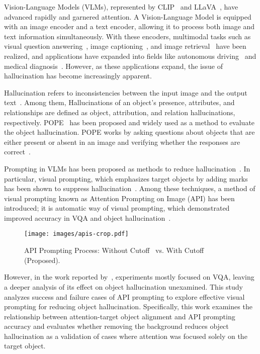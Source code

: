 Vision-Language Models (VLMs), represented by CLIP~\cite{clip} and LLaVA~\cite{llava}, have advanced rapidly and garnered attention. A Vision-Language Model is equipped with an image encoder and a text encoder, allowing it to process both image and text information simultaneously. With these encoders, multimodal tasks such as visual question answering~\cite{vqa}, image captioning~\cite{caption}, and image retrieval~\cite{retrieval} have been realized, and applications have expanded into fields like autonomous driving~\cite{autonomous} and medical diagnosis~\cite{medical}. However, as these applications expand, the issue of hallucination has become increasingly apparent.

Hallucination refers to inconsistencies between the input image and the output text~\cite{hallucination}. Among them, Hallucinations of an object's presence, attributes, and relationships are defined as object, attribution, and relation hallucinations, respectively. POPE~\cite{pope} has been proposed and widely used as a method to evaluate the object hallucination. POPE works by asking questions about objects that are either present or absent in an image and verifying whether the responses are correct~\cite{pope}.

Prompting in VLMs has been proposed as methods to reduce hallucination~\cite{prompting}. In particular, visual prompting, which emphasizes target objects by adding marks has been shown to suppress hallucination~\cite{visualprompting}. Among these techniques, a method of visual prompting known as Attention Prompting on Image (API) has been introduced; it is automatic way of visual prompting, which demonstrated improved accuracy in VQA and object hallucination~\cite{api}. 

\begin{figure}[t]
    \centering
    \texttt{[image: images/apis-crop.pdf]}
    \caption{API Prompting Process: Without Cutoff~\cite{api} vs. With Cutoff (Proposed).}
    \label{api}
\end{figure}

However, in the work reported by~\citet{api}, experiments mostly focused on VQA, leaving a deeper analysis of its effect on object hallucination unexamined. This study analyzes success and failure cases of API prompting to explore effective visual prompting for reducing object hallucination. Specifically, this work examines the relationship between attention-target object alignment and API prompting accuracy and evaluates whether removing the background reduces object hallucination as a validation of cases where attention was focused solely on the target object.